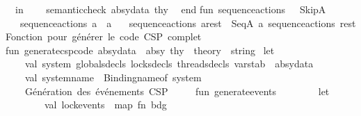 \begin{isabellebody}
\ \ in\isanewline
\ \ \ \ semantic{\isacharunderscore}{\kern0pt}check\ absy{\isacharunderscore}{\kern0pt}data\ thy\isanewline
\ \ end\isanewline
\isanewline
fun\ sequence{\isacharunderscore}{\kern0pt}actions\ {\isacharbrackleft}{\kern0pt}{\isacharbrackright}{\kern0pt}\ {\isacharequal}{\kern0pt}\ SkipA\isanewline
\ \ {\isacharbar}{\kern0pt}\ sequence{\isacharunderscore}{\kern0pt}actions\ {\isacharbrackleft}{\kern0pt}a{\isacharbrackright}{\kern0pt}\ {\isacharequal}{\kern0pt}\ a\isanewline
\ \ {\isacharbar}{\kern0pt}\ sequence{\isacharunderscore}{\kern0pt}actions\ {\isacharparenleft}{\kern0pt}a{\isacharcolon}{\kern0pt}{\isacharcolon}{\kern0pt}rest{\isacharparenright}{\kern0pt}\ {\isacharequal}{\kern0pt}\ SeqA\ {\isacharparenleft}{\kern0pt}a{\isacharcomma}{\kern0pt}\ sequence{\isacharunderscore}{\kern0pt}actions\ rest{\isacharparenright}{\kern0pt}\isanewline
{\isacharparenleft}{\kern0pt}{\isacharasterisk}{\kern0pt}\isanewline
{\isacharparenleft}{\kern0pt}{\isacharasterisk}{\kern0pt}Fonction\ pour\ générer\ le\ code\ CSP\ complet\ {\isacharasterisk}{\kern0pt}{\isacharparenright}{\kern0pt}\isanewline
fun\ generate{\isacharunderscore}{\kern0pt}csp{\isacharunderscore}{\kern0pt}code\ {\isacharparenleft}{\kern0pt}absy{\isacharunderscore}{\kern0pt}data\ {\isacharcolon}{\kern0pt}\ absy{\isacharparenright}{\kern0pt}\ {\isacharparenleft}{\kern0pt}thy\ {\isacharcolon}{\kern0pt}\ theory{\isacharparenright}{\kern0pt}\ {\isacharcolon}{\kern0pt}\ string\ {\isacharequal}{\kern0pt}\isanewline
let\isanewline
\ \ \ \ val\ {\isacharbraceleft}{\kern0pt}system{\isacharcomma}{\kern0pt}\ globals{\isacharunderscore}{\kern0pt}decls{\isacharcomma}{\kern0pt}\ locks{\isacharunderscore}{\kern0pt}decls{\isacharcomma}{\kern0pt}\ threads{\isacharunderscore}{\kern0pt}decls{\isacharcomma}{\kern0pt}\ varstab{\isacharbraceright}{\kern0pt}\ {\isacharequal}{\kern0pt}\ absy{\isacharunderscore}{\kern0pt}data\isanewline
\ \ \ \ val\ system{\isacharunderscore}{\kern0pt}name\ {\isacharequal}{\kern0pt}\ Binding{\isachardot}{\kern0pt}name{\isacharunderscore}{\kern0pt}of\ system\isanewline
\isanewline
\ \ \ \ {\isacharparenleft}{\kern0pt}{\isacharasterisk}{\kern0pt}Génération\ des\ événements\ CSP\ {\isacharasterisk}{\kern0pt}{\isacharparenright}{\kern0pt}\isanewline
\ \ \ \ fun\ generate{\isacharunderscore}{\kern0pt}events\ {\isacharparenleft}{\kern0pt}{\isacharparenright}{\kern0pt}\ {\isacharequal}{\kern0pt}\isanewline
\ \ \ \ \ \ let\isanewline
\ \ \ \ \ \ \ \ val\ lock{\isacharunderscore}{\kern0pt}events\ {\isacharequal}{\kern0pt}\ map\ {\isacharparenleft}{\kern0pt}fn\ {\isacharparenleft}{\kern0pt}bdg{\isacharcomma}{\kern0pt}\ {\isacharunderscore}{\kern0pt}{\isacharcomma}{\kern0pt}\ {\isacharunderscore}{\kern0pt}{\isacharparenright}{\kern0pt}\ {\isacharequal}{\kern0pt}{\isachargreater}{\kern0pt}\ \isanewline

\end{isabellebody}
